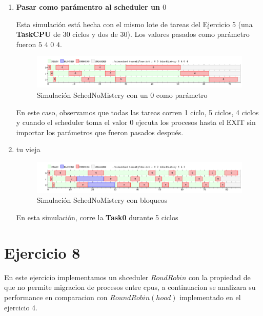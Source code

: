\documentclass[11pt]{article}
\begin{document}
\begin{enumerate}
\item \textbf{Pasar como parámentro al scheduler un $0$}

Esta simulación está hecha con el mismo lote de tareas del Ejercicio 5 (una \textbf{TaskCPU} de 30 ciclos y dos de 30). 
Los valores pasados como parámetro fueron $5$ $4$ $0$ $4$.


  \begin{figure}[H]
    \includegraphics[scale=0.5]{Ej7Ej1}
    \caption{Simulación SchedNoMistery con un 0 como parámetro} 
  \end{figure}

En este caso, observamos que todas las tareas corren 1 ciclo, 5 ciclos, 4 ciclos y cuando el scheduler toma el valor 0 ejecuta los procesos hasta el EXIT sin importar los parámetros que fueron pasados después.  

\item tu vieja

  \begin{figure}[H]
    \includegraphics[scale=0.5]{Ej7Ej2}
    \caption{Simulación SchedNoMistery con bloqueos} 
  \end{figure}

En esta simulación, corre la \textbf{Task0} durante 5 ciclos

\end{enumerate}

\section{Ejercicio 8}
En este ejercicio implementamos un shceduler $Roud Robin$ con la propiedad de que no permite migracion de procesos entre cpus, a continuacion se analizara su performance en comparacion con $Round Robin(hood)$ implementado en el ejercicio 4. \\
\end{document}
